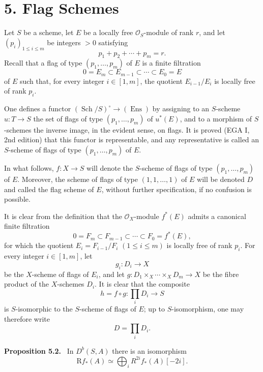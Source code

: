 \documentclass[11pt]{article}
\newenvironment{statement}[1]{\par\medskip\noindent\textbf{#1.}\ }{\par\medskip}
\begin{document}
\section*{5. Flag Schemes}

Let $S$ be a scheme, let $E$ be a locally free $\mathcal O_S$-module of rank $r$, and let $(p_i)_{1\le i\le m}$ be integers $>0$ satisfying
\[
p_1+p_2+\cdots+p_m=r.
\]
Recall that a flag of type $(p_1,\ldots,p_m)$ of $E$ is a finite filtration
\[
0=E_m\subset E_{m-1}\subset\cdots\subset E_0=E
\]
of $E$ such that, for every integer $i\in[1,m]$, the quotient $E_{i-1}/E_i$ is locally free of rank $p_i$.

One defines a functor $(\operatorname{Sch}/S)^\circ\to(\operatorname{Ens})$ by assigning to an $S$-scheme $u:T\to S$ the set of flags of type $(p_1,\ldots,p_m)$ of $u^*(E)$, and to a morphism of $S$-schemes the inverse image, in the evident sense, on flags. It is proved (EGA I, 2nd edition) that this functor is representable, and any representative is called an $S$-scheme of flags of type $(p_1,\ldots,p_m)$ of $E$.

In what follows, $f:X\to S$ will denote the $S$-scheme of flags of type $(p_1,\ldots,p_m)$ of $E$. Moreover, the scheme of flags of type $(1,1,\ldots,1)$ of $E$ will be denoted $D$ and called the flag scheme of $E$, without further specification, if no confusion is possible.

It is clear from the definition that the $\mathcal O_X$-module $f^*(E)$ admits a canonical finite filtration
\[
0=F_m\subset F_{m-1}\subset\cdots\subset F_0=f^*(E),
\]
for which the quotient $E_i=F_{i-1}/F_i$ $(1\le i\le m)$ is locally free of rank $p_i$. For every integer $i\in[1,m]$, let
\[
g_i:D_i\to X
\]
be the $X$-scheme of flags of $E_i$, and let $g:D_1\times_X\cdots\times_X D_m\to X$ be the fibre product of the $X$-schemes $D_i$. It is clear that the composite
\[
h=f\circ g:\prod_iD_i\to S
\tag{5.1}
\]
is $S$-isomorphic to the $S$-scheme of flags of $E$; up to $S$-isomorphism, one may therefore write
\[
D=\prod_iD_i.
\]

\begin{statement}{Proposition 5.2}
In $D^b(S,A)$ there is an isomorphism
\[
\mathrm Rf_*(A)\simeq\bigoplus_i R^{2i}f_*(A)[-2i].
\]
\end{statement}
\end{document}

